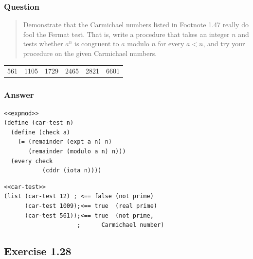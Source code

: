 \documentclass[final,fleqn,titlepage]{article}
\begin{document}
\subsubsection{Question}
\label{sec:org38353ba}
\begin{quote}
Demonstrate that the Carmichael numbers listed in Footnote 1.47 really do fool
the Fermat test. That is, write a procedure that takes an integer \(n\) and
tests whether \(a^n\) is congruent to \(a\) modulo \(n\) for every \(a < n\),
and try your procedure on the given Carmichael numbers.
\end{quote}
\begin{table}[htbp]
\label{carmichael}
\centering
\begin{tabular}{rrrrrr}
561 & 1105 & 1729 & 2465 & 2821 & 6601\\
\end{tabular}
\end{table}
\subsubsection{Answer}
\label{sec:org26f2bd9}
\begin{verbatim}
<<expmod>>
(define (car-test n)
  (define (check a)
    (= (remainder (expt a n) n)
       (remainder (modulo a n) n)))
  (every check
           (cddr (iota n))))
\end{verbatim}

\begin{verbatim}
<<car-test>>
(list (car-test 12) ; <== false (not prime)
      (car-test 1009);<== true  (real prime)
      (car-test 561));<== true  (not prime,
                     ;      Carmichael number)
\end{verbatim}

\subsection{Exercise 1.28}
\label{sec:orgb568fa3}
\end{document}
